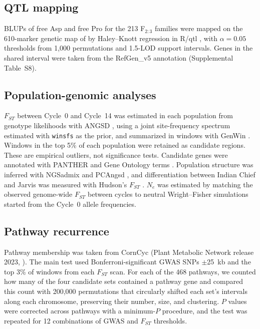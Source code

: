\documentclass[namedate,unnumsec,webpdf,contemporary,large]{oup-authoring-template}
\begin{document}
\subsection{QTL mapping}
BLUPs of free Asp and free Pro for the 213 F$_{2:3}$ families were mapped on the 610-marker genetic map of \citet{Fitzsimmons2026KernelKitchen} by Haley--Knott regression in R/qtl \citep{Broman2003}, with $\alpha = 0.05$ thresholds from 1,000 permutations and 1.5-LOD support intervals. Genes in the shared interval were taken from the RefGen\_v5 annotation (Supplemental Table~S8).

\subsection{Population-genomic analyses}
$F_{ST}$ between Cycle~0 and Cycle~14 was estimated in each population from genotype likelihoods with ANGSD \citep{Korneliussen2014ANGSD}, using a joint site-frequency spectrum estimated with \texttt{winsfs} \citep{Rasmussen2022winsfs} as the prior, and summarized in windows with GenWin \citep{Beissinger2015GenWin}. Windows in the top 5\% of each population were retained as candidate regions. These are empirical outliers, not significance tests. Candidate genes were annotated with PANTHER \citep{Thomas2022PANTHER} and Gene Ontology terms \citep{GO2026}. Population structure was inferred with NGSadmix \citep{Skotte2013NGSadmix} and PCAngsd \citep{Meisner2018PCAngsd}, and differentiation between Indian Chief and Jarvis was measured with Hudson's $F_{ST}$ \citep{Bhatia2013Fst}. $N_e$ was estimated by matching the observed genome-wide $F_{ST}$ between cycles to neutral Wright--Fisher simulations started from the Cycle~0 allele frequencies.

\subsection{Pathway recurrence}
Pathway membership was taken from CornCyc (Plant Metabolic Network release 2023, \citealp{Hawkins2021PMN}). The main test used Bonferroni-significant GWAS SNPs $\pm$25~kb and the top 3\% of windows from each $F_{ST}$ scan. For each of the 468 pathways, we counted how many of the four candidate sets contained a pathway gene and compared this count with 200,000 permutations that circularly shifted each set's intervals along each chromosome, preserving their number, size, and clustering. $P$ values were corrected across pathways with a minimum-$P$ procedure, and the test was repeated for 12 combinations of GWAS and $F_{ST}$ thresholds.
\end{document}
